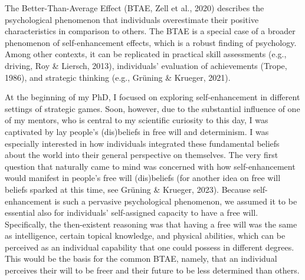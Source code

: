 \documentclass[authordate, anecdote]{jote-new-article}
\author[1, 2]{\mbox{David Grüning\orcid{0000-0002-9274-5477}}}
\affil[1]{Psychology Department, Heidelberg University}
\affil[2]{Department of Survey Design \& Methodology, GESIS - Leibniz-Institute for the Social Sciences}
\begin{document}
\begin{frontmatter}
  \maketitle
  \begin{abstract}
    \printabstracttext
  \end{abstract}
\end{frontmatter}







	The Better-Than-Average Effect (BTAE, Zell et al., 2020) describes the psychological phenomenon that individuals overestimate their positive characteristics in comparison to others. The BTAE is a special case of a broader phenomenon of self-enhancement effects, which is a robust finding of psychology. Among other contexts, it can be replicated in practical skill assessments (e.g., driving, Roy \& Liersch, 2013), individuals' evaluation of achievements (Trope, 1986), and strategic thinking (e.g., Grüning \& Krueger, 2021).



	At the beginning of my PhD, I focused on exploring self-enhancement in different settings of strategic games. Soon, however, due to the substantial influence of one of my mentors, who is central to my scientific curiosity to this day, I was captivated by lay people's (dis)beliefs in free will and determinism. I was especially interested in how individuals integrated these fundamental beliefs about the world into their general perspective on themselves. The very first question that naturally came to mind was concerned with how self-enhancement would manifest in people's free will (dis)beliefs (for another idea on free will beliefs sparked at this time, see Grüning \& Krueger, 2023). Because self-enhancement is such a pervasive psychological phenomenon, we assumed it to be essential also for individuals' self-assigned capacity to have a free will. Specifically, the then-existent reasoning was that having a free will was the same as intelligence, certain topical knowledge, and physical abilities, which can be perceived as an individual capability that one could possess in different degrees. This would be the basis for the common BTAE, namely, that an individual perceives their will to be freer and their future to be less determined than others.
\end{document}
